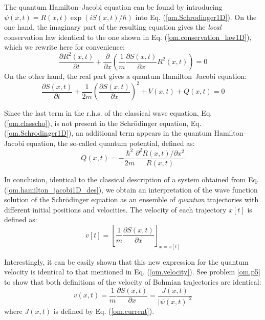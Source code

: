 \documentclass[onecolumn,nofootinbib, secnumarabic, amsmath, nobibnotes,11pt,aps,pra]{revtex4-1}
\newcommand{\eref}[1]{Eq. (\ref{#1})}
\begin{document}
The quantum Hamilton--Jacobi equation can be found by introducing $\psi(x,t) = R(x,t) \exp(i S(x,t)/\hbar)$ into \eref{om.Schrodinger1D}. On the one hand, the imaginary part of the resulting equation gives the \textit{local} conservation law identical to the one shown in \eref{om.conservation_law1D}, which we rewrite here for convenience:
\begin{equation}
\frac{\partial R^2(x,t)}{\partial t} + \frac {\partial } {\partial x} \left(\frac {1} {m} \frac {\partial S(x,t)}{\partial x} R^2(x,t) \right) = 0
\end{equation}
On the other hand, the real part gives a quantum Hamilton--Jacobi equation:
\begin{equation}
\label{om.hamilton_jacobi1D_des}
\frac{\partial S(x,t)}{\partial t} + \frac {1} {2 m} \left(\frac{ \partial S(x,t)} {\partial x} \right)^2 + V(x,t) + Q(x,t) = 0
\end{equation}

Since the last term in the r.h.s. of the classical wave equation, \eref{om.classcho}, is not present in the Schr\"odinger equation, \eref{om.Schrodinger1D}, an additional term appears in the quantum Hamilton--Jacobi equation, the so-called quantum potential, defined as:
\begin{equation}
\label{om.quantum_potential1D}
Q(x,t) = -\frac{\hbar^2} {2 m} \frac{{\partial}^2 R(x,t)/ \partial x^2} {R(x,t)}
\end{equation}

In conclusion, identical to the classical description of a system obtained from \eref{om.hamilton_jacobi1D_des}, we obtain an interpretation of the wave function solution of the Schr\"odinger equation as an ensemble of \textit{quantum} trajectories with different initial positions and velocities.
The velocity of each trajectory $x[t]$ is defined as:
\begin{equation}
\label{om.velocity_dSdx}
v[t] = \left[\frac{1}{m} \frac{\partial S(x,t)}{\partial x}\right]_{x = x[t]}
\end{equation}

Interestingly, it can be easily shown that this new expression for
the quantum velocity is identical to that mentioned in
\eref{om.velocity}. See problem \ref{om.p5} to show that both
definitions of the velocity of Bohmian trajectories are identical:
\begin{equation}
v(x,t) = \frac {1} {m} \frac {\partial S(x,t)} {\partial x} = \frac{J(x,t)} {|\psi(x,t)|^2}
\label{om.velocity2}
\end{equation}
where $J(x,t)$ is defined by \eref{om.current}.
\end{document}
